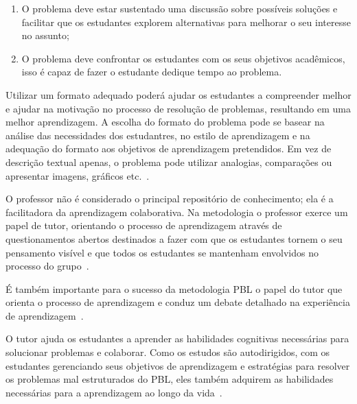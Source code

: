 \begin{enumerate}
{para não prejudicar os estudantes na
autoaprendizagem;}
\item{O problema deve estar sustentado uma discussão
sobre possíveis soluções e facilitar que os estudantes
explorem alternativas para melhorar o seu interesse
no assunto;}
\item{O problema deve confrontar os estudantes com
os seus objetivos acadêmicos, isso é capaz de
fazer o estudante dedique tempo ao problema.}
\end{enumerate}

Utilizar um formato adequado poderá ajudar os estudantes
a compreender melhor e ajudar na motivação no processo
de resolução de problemas, resultando em uma
melhor aprendizagem.
A escolha do formato do problema pode se basear na análise
das necessidades dos estudantres, no estilo de aprendizagem
e na adequação do formato aos objetivos de
aprendizagem pretendidos.
Em vez de descrição textual apenas, o problema pode
utilizar analogias, comparações ou apresentar imagens,
gráficos etc.~\cite{sockalingam2011student}.


O professor não é considerado o principal repositório
de conhecimento; ela é a facilitadora da aprendizagem
colaborativa.
Na metodologia o professor exerce um papel de tutor, orientando
o processo de aprendizagem através de questionamentos abertos
destinados a fazer com que os estudantes tornem o seu pensamento
visível e que todos os estudantes se mantenham envolvidos
no processo do grupo~\cite{hmelo2004problem}.

É também importante para o sucesso da metodologia PBL o
papel do tutor que orienta o processo de aprendizagem
e conduz um debate detalhado na experiência de
aprendizagem~\cite{savery2015overview}.

O tutor ajuda os estudantes a aprender as habilidades cognitivas
necessárias para solucionar problemas e colaborar.
Como os estudos são autodirigidos, com os estudantes gerenciando
seus objetivos de aprendizagem e estratégias
para resolver os problemas mal estruturados do PBL, eles
também adquirem as habilidades necessárias para a
aprendizagem ao longo da vida~\cite{hmelo2004problem}.

